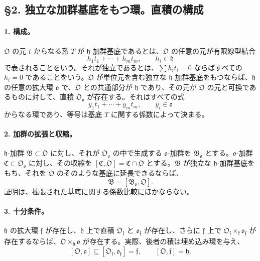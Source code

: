 \documentclass[11pt]{article}
\begin{document}
\subsection*{§2. 独立な加群基底をもつ環。直積の構成}

\paragraph{1. 構成。}
\(\mathfrak O\) の元 \(t\) からなる系 \(T\) が \(\mathfrak h\)-加群基底であるとは、\(\mathfrak O\) の任意の元が有限線型結合
\[
        h_1t_1+\cdots+h_mt_m,
        \qquad h_i\in\mathfrak h
\]
で表されることをいう。それが独立であるとは、\(\sum h_it_i=0\) ならばすべての \(h_i=0\) であることをいう。\(\mathfrak O\) が単位元を含む独立な \(\mathfrak h\)-加群基底をもつならば、\(\mathfrak h\) の任意の拡大環 \(\mathfrak o\) で、\(\mathfrak O\) との共通部分が \(\mathfrak h\) であり、その元が \(\mathfrak O\) の元と可換であるものに対して、直積 \(\mathfrak O_{\mathfrak o}\) が存在する。それはすべての式
\[
        y_1t_1+\cdots+y_mt_m,
        \qquad y_i\in\mathfrak o
\]
からなる環であり、等号は基底 \(T\) に関する係数によって決まる。

\paragraph{2. 加群の拡張と収縮。}
\(\mathfrak h\)-加群 \(\mathfrak B\subset\mathfrak O\) に対し、それが \(\mathfrak O_{\mathfrak o}\) の中で生成する \(\mathfrak o\)-加群を \(\mathfrak B_{\mathfrak o}\) とする。\(\mathfrak o\)-加群 \(\mathfrak C\subset\mathfrak O_{\mathfrak o}\) に対し、その収縮を \([\mathfrak C,\mathfrak O]=\mathfrak C\cap\mathfrak O\) とする。\(\mathfrak B\) が独立な \(\mathfrak h\)-加群基底をもち、それを \(\mathfrak O\) のそのような基底に延長できるならば、
\[
        \mathfrak B=[\mathfrak B_{\mathfrak o},\mathfrak O].
\]
証明は、拡張された基底に関する係数比較にほかならない。

\paragraph{3. 十分条件。}
\(\mathfrak h\) の拡大環 \(\mathfrak f\) が存在し、\(\mathfrak h\) 上で直積 \(\mathfrak O_{\mathfrak f}\) と \(\mathfrak o_{\mathfrak f}\) が存在し、さらに \(\mathfrak f\) 上で \(\mathfrak O_{\mathfrak f}\times_{\mathfrak f}\mathfrak o_{\mathfrak f}\) が存在するならば、\(\mathfrak O\times_{\mathfrak h}\mathfrak o\) が存在する。実際、後者の積は埋め込み環を与え、
\[
        [\mathfrak O,\mathfrak o]\subseteq [\mathfrak O_{\mathfrak f},\mathfrak o_{\mathfrak f}]=\mathfrak f,
        \qquad [\mathfrak O,\mathfrak f]=\mathfrak h.
\]
\end{document}
